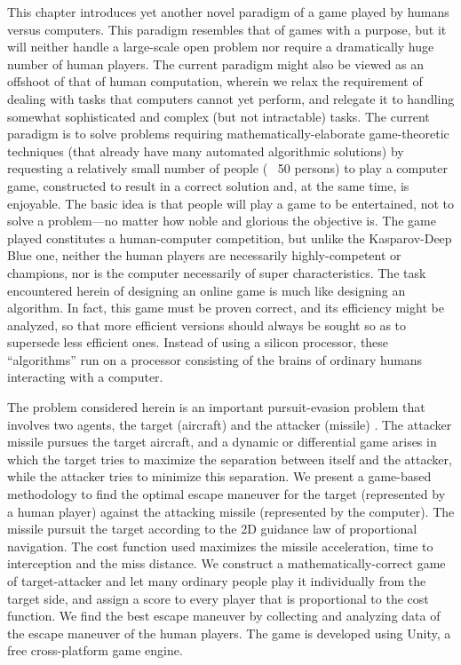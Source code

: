 This chapter introduces yet another novel paradigm of a game played by humans versus computers. This paradigm resembles that of games with a purpose, but it will neither handle a large-scale open problem nor require a dramatically huge number of human players. The current paradigm might also be viewed as an offshoot of that of human computation, wherein we relax the requirement of dealing with tasks that computers cannot yet perform, and relegate it to handling somewhat sophisticated and complex (but not intractable) tasks. The current paradigm is to solve problems requiring mathematically-elaborate game-theoretic techniques (that already have many automated algorithmic solutions) by requesting a relatively small number of people (~ 50 persons) to play a computer game, constructed to result in a correct solution and, at the same time, is enjoyable. The basic idea is that people will play a game to be entertained, not to solve a problem—no matter how noble and glorious the objective is. The game played constitutes a human-computer competition, but unlike the Kasparov-Deep Blue one, neither the human players are necessarily highly-competent or champions, nor is the computer necessarily of super characteristics. The task encountered herein of designing an online game is much like designing an algorithm. In fact, this game must be proven correct, and its efficiency might be analyzed, so that more efficient versions should always be sought so as to supersede less efficient ones. Instead of using a silicon processor, these “algorithms” run on a processor consisting of the brains of ordinary humans interacting with a computer.


The problem considered herein is an important pursuit-evasion problem that involves two agents, the target (aircraft) and the attacker (missile) \cite{stevens2015aircraft,perh2011study,eklund2012switched,hsueh2014integrated,sun2014guidance}. The attacker missile pursues the target aircraft, and a dynamic or differential game arises in which the target tries to maximize the separation between itself and the attacker, while the attacker tries to minimize this separation. We present a game-based methodology to find the optimal escape maneuver for the target (represented by a human player) against the attacking missile (represented by the computer). The missile pursuit the target according to the 2D guidance law of proportional navigation. The cost function used maximizes the missile acceleration, time to interception and the miss distance. We construct a mathematically-correct game of target-attacker and let many ordinary people play it individually from the target side, and assign a score to every player that is proportional to the cost function. We find the best escape maneuver by collecting and analyzing data of the escape maneuver of the human players. The game is developed using Unity, a free cross-platform game engine.

